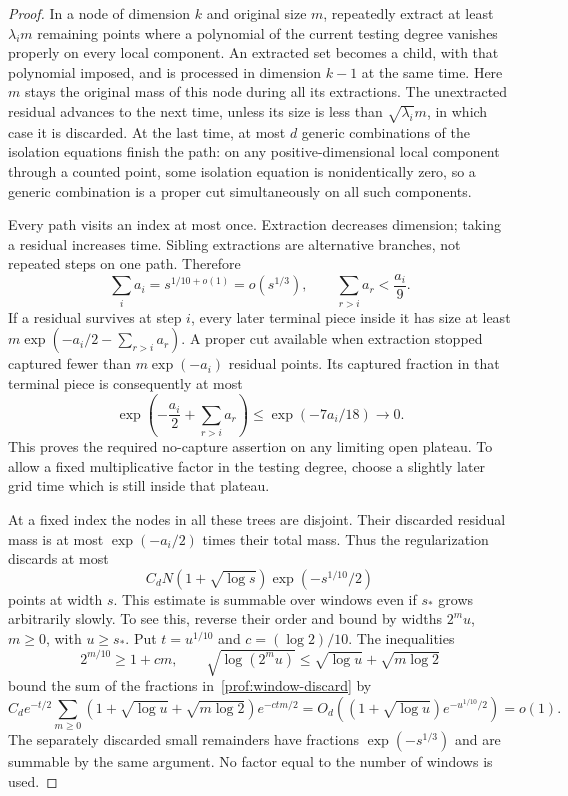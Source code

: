 \begin{proof}
In a node of dimension $k$ and original size $m$, repeatedly extract
at least $\lambda_i m$ remaining points where a polynomial of the
current testing degree vanishes properly on every local component.
An extracted set becomes a child, with that polynomial imposed, and
is processed in dimension $k-1$ at the same time.  Here $m$ stays the
original mass of this node during all its extractions.  The
unextracted residual advances to the next time, unless its size is
less than $\sqrt{\lambda_i}m$, in which case it is discarded.  At the
last time, at most $d$ generic combinations of the isolation equations
finish the path: on any positive-dimensional local component through
a counted point, some isolation equation is nonidentically zero, so
a generic combination is a proper cut simultaneously on all such
components.

Every path visits an index at most once.  Extraction decreases
dimension; taking a residual increases time.  Sibling extractions
are alternative branches, not repeated steps on one path.  Therefore
\[
 \sum_i a_i=s^{1/10+o(1)}=o(s^{1/3}),\qquad
 \sum_{r>i}a_r<\frac{a_i}{9}.
\]
If a residual survives at step $i$, every later terminal piece inside
it has size at least
$m\exp(-a_i/2-\sum_{r>i}a_r)$.  A proper cut available when
extraction stopped captured fewer than $m\exp(-a_i)$ residual points.
Its captured fraction in that terminal piece is consequently at most
\begin{equation}\label{prof:fragmentation-bound}
 \exp\left(-\frac{a_i}{2}+\sum_{r>i}a_r\right)
 \le \exp(-7a_i/18)\longrightarrow0.
\end{equation}
This proves the required no-capture assertion on any limiting open
plateau.  To allow a fixed multiplicative factor in the testing
degree, choose a slightly later grid time which is still inside that
plateau.

At a fixed index the nodes in all these trees are disjoint.  Their
discarded residual mass is at most $\exp(-a_i/2)$ times their total
mass.  Thus the regularization discards at most
\begin{equation}\label{prof:window-discard}
 C_d N(1+\sqrt{\log s})\exp(-s^{1/10}/2)
\end{equation}
points at width $s$.  This estimate is summable over windows even if
$s_*$ grows arbitrarily slowly.  To see this, reverse their order and
bound by widths $2^m u$, $m\ge0$, with $u\ge s_*$.  Put $t=u^{1/10}$
and $c=(\log2)/10$.  The inequalities
\[
 2^{m/10}\ge1+cm,\qquad
 \sqrt{\log(2^m u)}\le\sqrt{\log u}+\sqrt{m\log2}
\]
bound the sum of the fractions in~\eqref{prof:window-discard} by
\[
 C_d e^{-t/2}\sum_{m\ge0}
 (1+\sqrt{\log u}+\sqrt{m\log2})e^{-ctm/2}
 =O_d((1+\sqrt{\log u})e^{-u^{1/10}/2})=o(1).
\]
The separately discarded small remainders have fractions
$\exp(-s^{1/3})$ and are summable by the same argument.  No factor
equal to the number of windows is used.


\end{proof}

